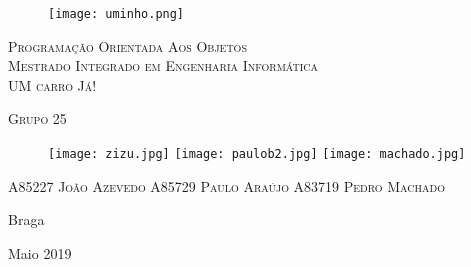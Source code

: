 \documentclass[a4paper,11pt]{report}
\begin{document}


\begin{titlepage}
    \center
    {

    \begin{figure}[t]
        \centering
        \texttt{[image: uminho.png]}
        \label{img:logo}
        \vspace{2.0cm}
    \end{figure}

    \vspace{3.0cm}
    \textsc{\huge Programação Orientada Aos Objetos}\\[0.5cm]
    \textsc{\Large{Mestrado Integrado em Engenharia Informática}}\\[0.5cm]
    \vspace{2.0cm}
    \textsc{\Huge{UM carro Já!}}\\[0.5cm]
    
    \vspace{2.9cm}
    
    \textsc{\huge Grupo 25}\\[0.5cm]
        
    \vspace{0.5cm}
    
    \begin{figure}[htp]

        \centering
        \texttt{[image: zizu.jpg]}\hfill
        \texttt{[image: paulob2.jpg]}\hfill
        \texttt{[image: machado.jpg]}

        \label{fig:figure3}

    \end{figure}
    
     \begin{flushleft}
        
         \textsc{\normalsize A85227 João Azevedo \hspace{1cm} A85729 Paulo Araújo \hspace{1cm} A83719 Pedro Machado}
    \end{flushleft}
    
        \vspace{1cm}
    \begin{flushright}
        Braga

        Maio 2019
    \end{flushright}

\date{\today}
}
\end{titlepage}
\end{document}

